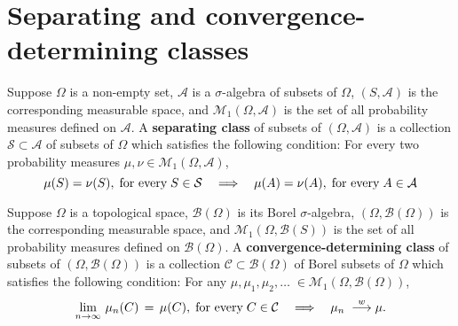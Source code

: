 

\section{Separating and convergence-determining classes}
\setcounter{theorem}{0}
\setcounter{equation}{0}

\renewcommand{\theenumi}{\roman{enumi}}
\renewcommand{\labelenumi}{\textnormal{(\theenumi)}$\;\;$}

\begin{definition}
\mbox{}\vskip 0.1cm
\noindent
Suppose $\Omega$ is a non-empty set, $\mathcal{A}$ is a $\sigma$-algebra of subsets of $\Omega$,
$(S,\mathcal{A})$ is the corresponding measurable space, and
$\mathcal{M}_{1}\!\left(\Omega,\mathcal{A}\right)$ is the set of all probability measures defined
on $\mathcal{A}$.
A \textbf{separating class} of subsets of $\left(\Omega,\mathcal{A}\right)$ is
a collection $\mathcal{S} \subset \mathcal{A}$ of subsets of $\Omega$
which satisfies the following condition:
For every two probability measures $\mu, \nu \in \mathcal{M}_{1}\!\left(\Omega,\mathcal{A}\right)$,
\begin{equation*}
\mu(S) = \nu(S), \;\textnormal{for every}\; S \in \mathcal{S}
\quad\Longrightarrow\quad
\mu(A) = \nu(A), \;\textnormal{for every}\; A \in \mathcal{A}		
\end{equation*}
\end{definition}

\begin{definition}
\mbox{}\vskip 0.1cm
\noindent
Suppose $\Omega$ is a topological space, $\mathcal{B}(\Omega)$ is its Borel $\sigma$-algebra,
$(\Omega,\mathcal{B}(\Omega))$ is the corresponding measurable space, and
$\mathcal{M}_{1}\!\left(\Omega,\mathcal{B}(S)\right)$ is the set of all probability measures defined
on $\mathcal{B}(\Omega)$.
A \textbf{convergence-determining class} of subsets of $\left(\Omega,\mathcal{B}(\Omega)\right)$ is
a collection $\mathcal{C} \subset \mathcal{B}(\Omega)$ of Borel subsets of $\Omega$
which satisfies the following condition:
For any $\mu, \mu_{1}, \mu_{2}, \ldots\; \in \mathcal{M}_{1}\!\left(\Omega,\mathcal{B}(\Omega)\right)$,
\begin{equation*}
\lim_{n\rightarrow\infty}\,\mu_{n}(C) \, = \, \mu(C), \;\textnormal{for every}\; C \in \mathcal{C}
\quad\Longrightarrow\quad
\mu_{n} \; \overset{w}{\longrightarrow} \mu.
\end{equation*} 
\end{definition}


